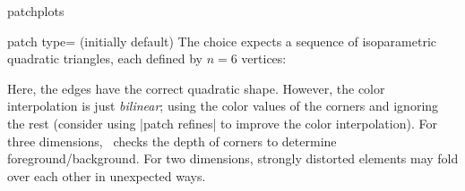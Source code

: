 {\begin{pgfplotslibrary}{patchplots}
\begin{pgfplotskey}{patch type= (initially default)}
	The choice  expects a sequence of isoparametric quadratic triangles, each defined by $n=6$ vertices:
\begin{codeexample}[]
\end{codeexample}
\begin{codeexample}[]
\end{codeexample}
	\noindent Here, the edges have the correct quadratic shape. However, the color interpolation is just \emph{bilinear}; using the color values of the corners and ignoring the rest (consider using |patch refines| to improve the color interpolation). For three dimensions, \PGFPlots\ checks the depth of corners to determine foreground/background. For two dimensions, strongly distorted elements may fold over each other in unexpected ways. 


\end{pgfplotskey}
\end{pgfplotslibrary}}
